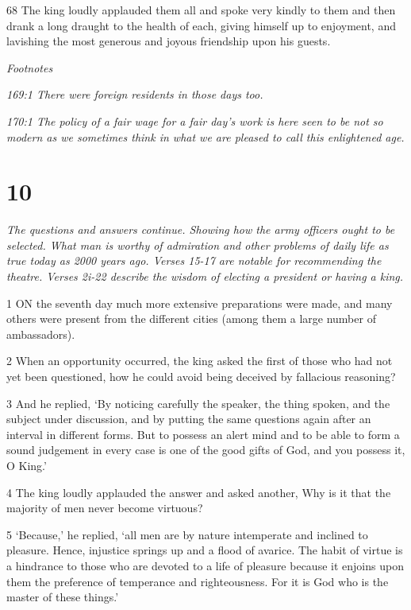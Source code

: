 \par 68 The king loudly applauded them all and spoke very kindly to them and then drank a long draught to the health of each, giving himself up to enjoyment, and lavishing the most generous and joyous friendship upon his guests.

\par \textit{Footnotes}

\par \textit{169:1 There were foreign residents in those days too.}

\par \textit{170:1 The policy of a fair wage for a fair day's work is here seen to be not so modern as we sometimes think in what we are pleased to call this enlightened age.}

\chapter{10}

\par \textit{The questions and answers continue. Showing how the army officers ought to be selected. What man is worthy of admiration and other problems of daily life as true today as 2000 years ago. Verses 15-17 are notable for recommending the theatre. Verses 2i-22 describe the wisdom of electing a president or having a king.}

\par 1 ON the seventh day much more extensive preparations were made, and many others were present from the different cities (among them a large number of ambassadors).

\par 2 When an opportunity occurred, the king asked the first of those who had not yet been questioned, how he could avoid being deceived by fallacious reasoning?

\par 3 And he replied, ‘By noticing carefully the speaker, the thing spoken, and the subject under discussion, and by putting the same questions again after an interval in different forms. But to possess an alert mind and to be able to form a sound judgement in every case is one of the good gifts of God, and you possess it, O King.’

\par 4 The king loudly applauded the answer and asked another, Why is it that the majority of men never become virtuous?

\par 5 ‘Because,’ he replied, ‘all men are by nature intemperate and inclined to pleasure. Hence, injustice springs up and a flood of avarice. The habit of virtue is a hindrance to those who are devoted to a life of pleasure because it enjoins upon them the preference of temperance and righteousness. For it is God who is the master of these things.’

